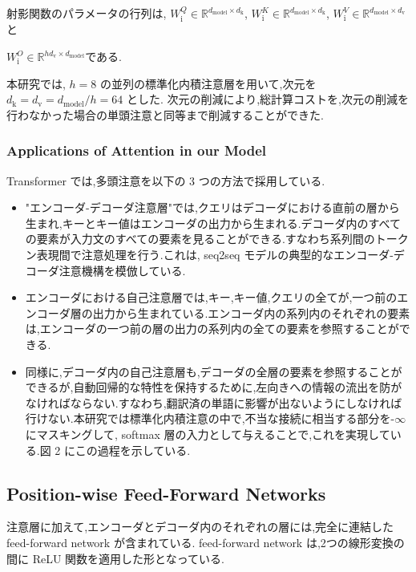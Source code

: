 \documentclass{jarticle}     %
\begin{document}
射影関数のパラメータの行列は,
$W_\mathrm{i}^Q \in \mathbb{R} ^ {{d_\mathrm{model}} \times {d_\mathrm{k}}}$,
$W_\mathrm{i}^K \in \mathbb{R} ^ {{d_\mathrm{model}} \times {d_\mathrm{k}}}$,
$W_\mathrm{i}^V \in \mathbb{R} ^ {{d_\mathrm{model}} \times {d_\mathrm{v}}}$と\par
$W_\mathrm{i}^O \in \mathbb{R} ^ {{hd_\mathrm{v}} \times {d_\mathrm{model}}}$である.

本研究では, $h=8$ の並列の標準化内積注意層を用いて,次元を
 $d_\mathrm{k} = d_\mathrm{v} = d_\mathrm{model}/h = 64$ とした.
次元の削減により,総計算コストを,次元の削減を行わなかった場合の単頭注意と同等まで削減することができた.

\subsubsection{Applications of Attention in our Model}
Transformer では,多頭注意を以下の 3 つの方法で採用している.
\begin{itemize}
  \item "エンコーダ-デコーダ注意層"では,クエリはデコーダにおける直前の層から生まれ,キーとキー値はエンコーダの出力から生まれる.デコーダ内のすべての要素が入力文のすべての要素を見ることができる.すなわち系列間のトークン表現間で注意処理を行う.これは, seq2seq モデルの典型的なエンコーダ-デコーダ注意機構を模倣している.
  \item エンコーダにおける自己注意層では,キー,キー値,クエリの全てが,一つ前のエンコーダ層の出力から生まれている.エンコーダ内の系列内のそれぞれの要素は,エンコーダの一つ前の層の出力の系列内の全ての要素を参照することができる.
  \item 同様に,デコーダ内の自己注意層も,デコーダの全層の要素を参照することができるが,自動回帰的な特性を保持するために,左向きへの情報の流出を防がなければならない.すなわち,翻訳済の単語に影響が出ないようにしなければ行けない.本研究では標準化内積注意の中で,不当な接続に相当する部分を-$\infty$にマスキングして, softmax 層の入力として与えることで,これを実現している.図 2 にこの過程を示している.
\end{itemize}

\subsection{Position-wise Feed-Forward Networks}
注意層に加えて,エンコーダとデコーダ内のそれぞれの層には,完全に連結した feed-forward network が含まれている. feed-forward network は,2つの線形変換の間に ReLU 関数を適用した形となっている.
\end{document}

